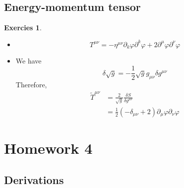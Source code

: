 \documentclass[11pt,a4paper]{article}
\theoremstyle{definition}
\newtheorem{exer}{Exercies}[subsection]
\begin{document}
\subsection{Energy-momentum tensor}
\begin{exer}
	\begin{itemize}
		\item \[
		T^{\mu \nu} = -\eta^{\mu \nu}\partial_{k}\varphi \partial^{k}\varphi + 2 \partial^{\mu}\varphi \partial^{\nu}\varphi
		\]
		\item We have
		\[
			\delta \sqrt{g}= -\frac{1}{2}\sqrt{g} g_{\mu\nu} \delta g^{\mu\nu}
		\]
		Therefore,
		\[
		\begin{aligned}
		\tilde{T}^{\mu\nu} &=\frac{2}{\sqrt{g}}\frac{\delta S}{\delta g^{\mu\nu}}\\
		&=\frac{1}{2} (-\delta_{\mu\nu}+2) \partial_{\mu} \varphi \partial_{\nu}\varphi
		\end{aligned}
		\]
	\end{itemize}
\end{exer}
\newpage
\section{Homework 4}
\subsection{Derivations}
\end{document}
